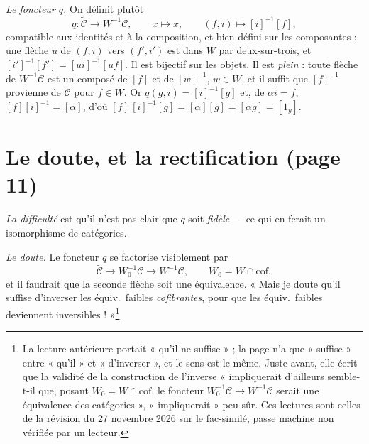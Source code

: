 \documentclass[11pt,a4paper]{article}
\begin{document}
\emph{Le foncteur $q$.} On définit plutôt
\[
q : \widetilde{\mathcal{C}} \longrightarrow W^{-1}\mathcal{C},
\qquad x \mapsto x, \qquad (f, i) \mapsto [i]^{-1}[f],
\]
compatible aux identités et à la composition, et bien défini sur les
composantes : une flèche $u$ de $(f,i)$ vers $(f',i')$ est dans $W$ par
deux-sur-trois, et $[i']^{-1}[f'] = [ui]^{-1}[uf]$. Il est bijectif sur les
objets. Il est \emph{plein} : toute flèche de $W^{-1}\mathcal{C}$ est un
composé de $[f]$ et de $[w]^{-1}$, $w \in W$, et il suffit que $[f]^{-1}$
provienne de $\widetilde{\mathcal{C}}$ pour $f \in W$. Or $q(g, i) =
[i]^{-1}[g]$ et, de $\alpha i = f$, $[f][i]^{-1} = [\alpha]$, d'où
$[f]\,[i]^{-1}[g] = [\alpha][g] = [\alpha g] = [1_{y}]$.

\section*{Le doute, et la rectification (page 11)}

\emph{La difficulté} est qu'il n'est pas clair que $q$ soit \emph{fidèle} --- ce
qui en ferait un isomorphisme de catégories.

\emph{Le doute.} Le foncteur $q$ se factorise visiblement par
\[
\widetilde{\mathcal{C}} \longrightarrow W_{0}^{-1}\mathcal{C}
\longrightarrow W^{-1}\mathcal{C}, \qquad W_{0} = W \cap \mathrm{cof},
\]
et il faudrait que la seconde flèche soit une équivalence. « Mais je doute
qu'il suffise d'inverser les équiv.\ faibles \emph{cofibrantes}, pour que les
équiv.\ faibles deviennent inversibles ! »\footnote{La lecture antérieure
portait « qu'il ne suffise » ; la page n'a que « suffise » entre « qu'il » et
« d'inverser », et le sens est le même. Juste avant, elle écrit que la
validité de la construction de l'inverse « impliquerait d'ailleurs
semble-t-il que, posant $W_{0} = W \cap \mathrm{cof}$, le foncteur
$W_{0}^{-1}\mathcal{C} \to W^{-1}\mathcal{C}$ serait une équivalence des
catégories », « impliquerait » peu sûr. Ces lectures sont celles de la
révision du 27 novembre 2026 sur le fac-similé, passe machine non vérifiée
par un lecteur.}
\end{document}
